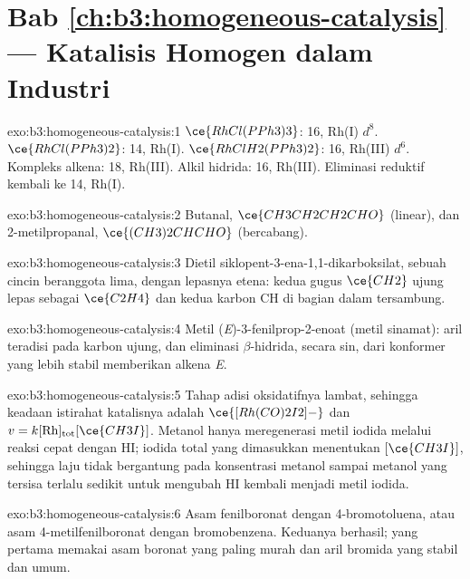 \section*{Bab \ref{ch:b3:homogeneous-catalysis} --- Katalisis Homogen dalam Industri}

\begin{solution}{exo:b3:homogeneous-catalysis:1}
$\ce{RhCl(PPh3)3}$: 16, Rh(I) $d^8$. $\ce{RhCl(PPh3)2}$: 14, Rh(I). $\ce{RhClH2(PPh3)2}$: 16, Rh(III) $d^6$.
Kompleks alkena: 18, Rh(III). Alkil hidrida: 16, Rh(III). Eliminasi reduktif
kembali ke 14, Rh(I).
\end{solution}

\begin{solution}{exo:b3:homogeneous-catalysis:2}
Butanal, $\ce{CH3CH2CH2CHO}$ (linear), dan 2-metilpropanal, $\ce{(CH3)2CHCHO}$ (bercabang).
\end{solution}

\begin{solution}{exo:b3:homogeneous-catalysis:3}
Dietil siklopent-3-ena-1,1-dikarboksilat, sebuah cincin beranggota lima, dengan lepasnya
etena: kedua gugus $\ce{CH2}$ ujung lepas sebagai $\ce{C2H4}$ dan kedua karbon CH di bagian dalam
tersambung.
\end{solution}

\begin{solution}{exo:b3:homogeneous-catalysis:4}
Metil (\textit{E})-3-fenilprop-2-enoat (metil sinamat): aril teradisi pada
karbon ujung, dan eliminasi $\beta$-hidrida, secara sin, dari konformer yang lebih stabil
memberikan alkena \textit{E}.
\end{solution}

\begin{solution}{exo:b3:homogeneous-catalysis:5}
Tahap adisi oksidatifnya lambat, sehingga keadaan istirahat katalisnya adalah $\ce{[Rh(CO)2I2]-}$ dan
$v = k[\mathrm{Rh}]_{\mathrm{tot}}[\ce{CH3I}]$. Metanol hanya meregenerasi metil iodida melalui reaksi cepat dengan HI;
iodida total yang dimasukkan menentukan $[\ce{CH3I}]$, sehingga laju tidak bergantung pada konsentrasi
metanol sampai metanol yang tersisa terlalu sedikit untuk mengubah HI kembali menjadi
metil iodida.
\end{solution}

\begin{solution}{exo:b3:homogeneous-catalysis:6}
Asam fenilboronat dengan 4-bromotoluena, atau asam 4-metilfenilboronat dengan
bromobenzena. Keduanya berhasil; yang pertama memakai asam boronat yang paling murah dan aril bromida
yang stabil dan umum.
\end{solution}

